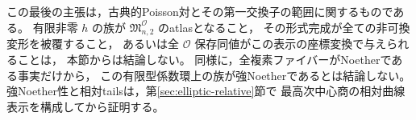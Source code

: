 \begin{remark}
この最後の主張は，古典的Poisson対とその第一交換子の範囲に関するものである。
有限非零 $h$ の族が $\mathfrak M^{\mathcal O}_{n,2}$ のatlasとなること，
その形式完成が全ての非可換変形を被覆すること，
あるいは全 $\mathcal O$ 保存同値がこの表示の座標変換で与えられることは，
本節からは結論しない。
同様に，全複素ファイバーがNoetherである事実だけから，
この有限型係数環上の族が強Noetherであるとは結論しない。
強Noether性と相対tailsは，第\ref{sec:elliptic-relative}節で
最高次中心商の相対曲線表示を構成してから証明する。
\end{remark}
